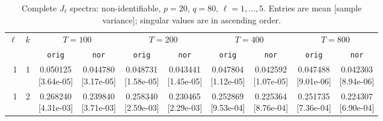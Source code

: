 \documentclass[12pt,letterpaper]{article}
\def\spacingset#1{\renewcommand{\baselinestretch}{#1}\small\normalsize}
\theoremstyle{plain}
\theoremstyle{definition}
\begin{document}
\clearpage
\begin{table}[p]
\begingroup
\spacingset{1.0}
\small\centering
\caption{Complete $J_\ell$ spectra: non-identifiable, $p=20$, $q=80$, $\ell=1,\ldots,5$. Entries are mean [sample variance]; singular values are in ascending order.}
\label{s23:lambda:alltab:spectra:p20q80exterior:1-5}
\footnotesize
\setlength{\tabcolsep}{2.2pt}
\renewcommand{\arraystretch}{1.03}
\begin{adjustbox}{max width=\linewidth}
\begin{tabular}{@{}rr*{8}{c}@{}}
\toprule
$\ell$ & $k$ & \multicolumn{2}{c}{$T=100$} & \multicolumn{2}{c}{$T=200$} & \multicolumn{2}{c}{$T=400$} & \multicolumn{2}{c}{$T=800$}\\
\cmidrule(lr){3-4}\cmidrule(lr){5-6}\cmidrule(lr){7-8}\cmidrule(lr){9-10}
 &  & \texttt{orig} & \texttt{nor} & \texttt{orig} & \texttt{nor} & \texttt{orig} & \texttt{nor} & \texttt{orig} & \texttt{nor}\\
\midrule
1 & 1 & \shortstack{0.050125\\[-1pt]{\scriptsize[3.64e-05]}} & \shortstack{0.044780\\[-1pt]{\scriptsize[3.17e-05]}} & \shortstack{0.048731\\[-1pt]{\scriptsize[1.58e-05]}} & \shortstack{0.043441\\[-1pt]{\scriptsize[1.45e-05]}} & \shortstack{0.047804\\[-1pt]{\scriptsize[1.12e-05]}} & \shortstack{0.042592\\[-1pt]{\scriptsize[1.07e-05]}} & \shortstack{0.047488\\[-1pt]{\scriptsize[9.01e-06]}} & \shortstack{0.042303\\[-1pt]{\scriptsize[8.94e-06]}}\\
1 & 2 & \shortstack{0.268240\\[-1pt]{\scriptsize[4.31e-03]}} & \shortstack{0.239840\\[-1pt]{\scriptsize[3.71e-03]}} & \shortstack{0.258340\\[-1pt]{\scriptsize[2.59e-03]}} & \shortstack{0.230465\\[-1pt]{\scriptsize[2.29e-03]}} & \shortstack{0.252869\\[-1pt]{\scriptsize[9.53e-04]}} & \shortstack{0.225364\\[-1pt]{\scriptsize[8.76e-04]}} & \shortstack{0.251735\\[-1pt]{\scriptsize[7.36e-04]}} & \shortstack{0.224307\\[-1pt]{\scriptsize[6.90e-04]}}\\

\end{tabular}
\end{adjustbox}
\end{table}
\end{document}
